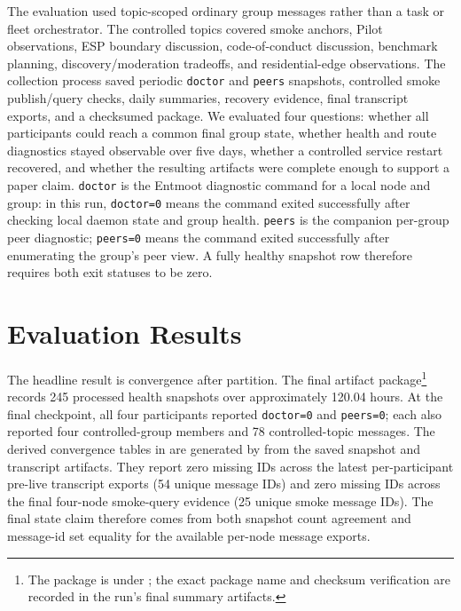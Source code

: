\documentclass[11pt,a4paper,twocolumn]{article}
\begin{document}
The evaluation used topic-scoped ordinary group messages rather than a task
or fleet orchestrator. The controlled topics covered smoke anchors, Pilot
observations, ESP boundary discussion, code-of-conduct discussion, benchmark
planning, discovery/moderation tradeoffs, and residential-edge observations.
The collection process saved periodic \texttt{doctor} and \texttt{peers}
snapshots, controlled smoke publish/query checks, daily summaries, recovery
evidence, final transcript exports, and a checksumed package. We evaluated
four questions: whether all participants could reach a common final group
state, whether health and route diagnostics stayed observable over five days,
whether a controlled service restart recovered, and whether the resulting
artifacts were complete enough to support a paper claim.
\texttt{doctor} is the Entmoot diagnostic command for a local node and group:
in this run, \texttt{doctor=0} means the command exited successfully after
checking local daemon state and group health. \texttt{peers} is the companion
per-group peer diagnostic; \texttt{peers=0} means the command exited
successfully after enumerating the group's peer view. A fully healthy snapshot
row therefore requires both exit statuses to be zero.

\section{Evaluation Results}
\label{sec:results}

The headline result is convergence after partition. The final artifact
package\footnote{The package is under ;
the exact package name and checksum verification are recorded in the run's
final summary artifacts.} records 245 processed health snapshots over
approximately 120.04 hours. At the final checkpoint, all four participants
reported \texttt{doctor=0} and \texttt{peers=0}; each also reported four
controlled-group members and 78 controlled-topic messages. The derived
convergence tables in  are generated by
 from the saved snapshot and
transcript artifacts. They report zero missing IDs across the latest
per-participant pre-live transcript exports (54 unique message IDs) and zero
missing IDs across the final four-node smoke-query evidence (25 unique smoke
message IDs). The final state claim therefore comes from both snapshot count
agreement and message-id set equality for the available per-node message
exports.
\end{document}
